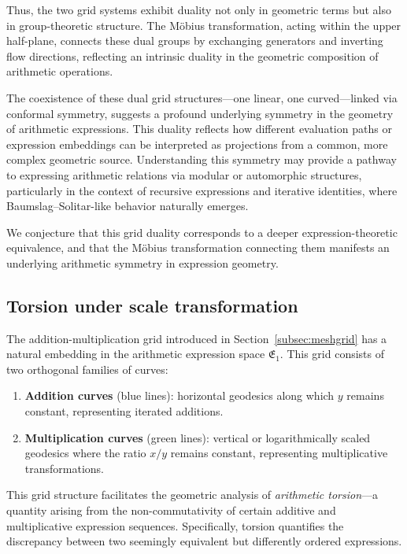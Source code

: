 Thus, the two grid systems exhibit duality not only in geometric terms but also in group-theoretic structure. The Möbius transformation, acting within the upper half-plane, connects these dual groups by exchanging generators and inverting flow directions, reflecting an intrinsic duality in the geometric composition of arithmetic operations.

The coexistence of these dual grid structures—one linear, one curved—linked via conformal symmetry, suggests a profound underlying symmetry in the geometry of arithmetic expressions. This duality reflects how different evaluation paths or expression embeddings can be interpreted as projections from a common, more complex geometric source. Understanding this symmetry may provide a pathway to expressing arithmetic relations via modular or automorphic structures, particularly in the context of recursive expressions and iterative identities, where Baumslag–Solitar-like behavior naturally emerges.

We conjecture that this grid duality corresponds to a deeper expression-theoretic equivalence, and that the Möbius transformation connecting them manifests an underlying arithmetic symmetry in expression geometry.

\subsection{Torsion under scale transformation}\label{subsec:gridsandtorsion}

The addition-multiplication grid introduced in Section~\ref{subsec:meshgrid} has a natural embedding in the arithmetic expression space $\mathfrak{E}_1$. This grid consists of two orthogonal families of curves:

\begin{enumerate}
    \item \textbf{Addition curves} (blue lines): horizontal geodesics along which $y$ remains constant, representing iterated additions.
    \item \textbf{Multiplication curves} (green lines): vertical or logarithmically scaled geodesics where the ratio $x/y$ remains constant, representing multiplicative transformations.
\end{enumerate}

This grid structure facilitates the geometric analysis of \emph{arithmetic torsion}—a quantity arising from the non-commutativity of certain additive and multiplicative expression sequences. Specifically, torsion quantifies the discrepancy between two seemingly equivalent but differently ordered expressions.

